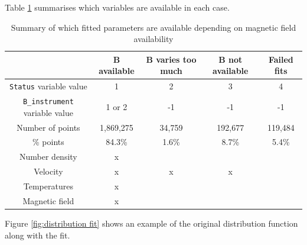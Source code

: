 \documentclass[11pt,a4paper]{article}
\begin{document}
\newline
\newline
Table \ref{tab:variable availability} summarises which variables are available in each case.
\begin{table}
	\centering
	\begin{tabular}{ c | c | c | c | c}
									& $\mathbf{B}$ available	& $\mathbf{B}$ varies too much	& $\mathbf{B}$ not available	& Failed fits 	\\ \hline
	\texttt{Status} variable value		& 1						& 2							& 3							& 4			\\ \hline
	\texttt{B\_instrument} variable value	& 1 or 2					& -1							& -1							& -1			\\ \hline			
	Number of points 					& 1,869,275				& 34,759							& 192,677					& 119,484	\\ \hline		
	\% points						& 84.3\%					& 1.6\%							& 8.7\%						& 5.4\%		\\ \hline \hline
	Number density					& x						&							&							&			\\ 
	Velocity							& x						& x							& x							&			\\ 
	Temperatures						& x						&							&							&			\\ 
	Magnetic field					& x						&							&							&			\\
	\end{tabular}
	\caption{Summary of which fitted parameters are available depending on magnetic field availability}
	\label{tab:variable availability}
\end{table}

Figure \ref{fig:distribution fit} shows an example of the original distribution function along with the fit.
\end{document}
